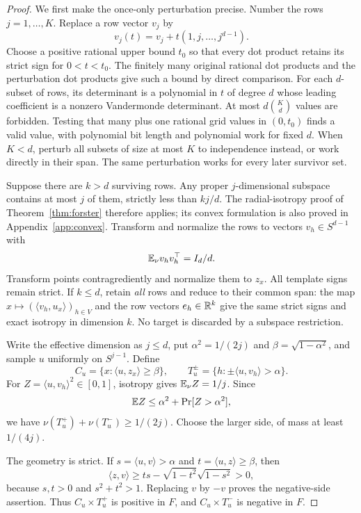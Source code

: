 \begin{proof}
We first make the once-only perturbation precise. Number the rows $j=1,\ldots,K$. Replace a row vector $v_j$ by
\[
 v_j(t)=v_j+t(1,j,\ldots,j^{d-1}).
\]
Choose a positive rational upper bound $t_0$ so that every dot product retains its strict sign for $0<t<t_0$. The finitely many original rational dot products and the perturbation dot products give such a bound by direct comparison. For each $d$-subset of rows, its determinant is a polynomial in $t$ of degree $d$ whose leading coefficient is a nonzero Vandermonde determinant. At most $d\binom Kd$ values are forbidden. Testing that many plus one rational grid values in $(0,t_0)$ finds a valid value, with polynomial bit length and polynomial work for fixed $d$. When $K<d$, perturb all subsets of size at most $K$ to independence instead, or work directly in their span. The same perturbation works for every later survivor set.

Suppose there are $k>d$ surviving rows. Any proper $j$-dimensional subspace contains at most $j$ of them, strictly less than $kj/d$. The radial-isotropy proof of Theorem~\ref{thm:forster} therefore applies; its convex formulation is also proved in Appendix~\ref{app:convex}. Transform and normalize the rows to vectors $v_h\in S^{d-1}$ with
\[
 \mathbb E_\nu v_hv_h^\top=I_d/d.
\]
Transform points contragrediently and normalize them to $z_x$. All template signs remain strict. If $k\le d$, retain \emph{all} rows and reduce to their common span: the map $x\mapsto (\langle v_h,u_x\rangle)_{h\in V}$ and the row vectors $e_h\in\mathbb R^k$ give the same strict signs and exact isotropy in dimension $k$. No target is discarded by a subspace restriction.

Write the effective dimension as $j\le d$, put $\alpha^2=1/(2j)$ and $\beta=\sqrt{1-\alpha^2}$, and sample $u$ uniformly on $S^{j-1}$. Define
\[
 C_u=\{x:\langle u,z_x\rangle\ge\beta\},\qquad
 T_u^\pm=\{h:\pm\langle u,v_h\rangle>\alpha\}.
\]
For $Z=\langle u,v_h\rangle^2\in[0,1]$, isotropy gives $\mathbb E_\nu Z=1/j$. Since
\[
 \mathbb E Z\le\alpha^2+\Pr[Z>\alpha^2],
\]
we have $\nu(T_u^+)+\nu(T_u^-)\ge1/(2j)$. Choose the larger side, of mass at least $1/(4j)$.

The geometry is strict. If $s=\langle u,v\rangle>\alpha$ and $t=\langle u,z\rangle\ge\beta$, then
\[
 \langle z,v\rangle\ge ts-\sqrt{1-t^2}\sqrt{1-s^2}>0,
\]
because $s,t>0$ and $s^2+t^2>1$. Replacing $v$ by $-v$ proves the negative-side assertion. Thus $C_u\times T_u^+$ is positive in $F$, and $C_u\times T_u^-$ is negative in $F$.


\end{proof}
